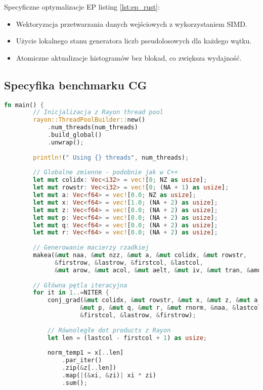 Specyficzne optymalizacje EP listing \ref{lst:ep_rust}:
\begin{itemize}
    \item Wektoryzacja przetwarzania danych wejściowych z wykorzystaniem SIMD.
    \item Użycie lokalnego stanu generatora liczb pseudolosowych dla każdego wątku.
    \item Atomiczne aktualizacje histogramów bez blokad, co zwiększa wydajność.
\end{itemize}

\subsection{Specyfika benchmarku CG}
\begin{lstlisting}[language=Rust, caption={Implementacja benchmarku CG w języku Rust}, label={lst:cg_rust}]
    fn main() {
        // Inicjalizacja z Rayon thread pool
        rayon::ThreadPoolBuilder::new()
            .num_threads(num_threads)
            .build_global()
            .unwrap();
    
        println!(" Using {} threads", num_threads);
        
        // Globalne zmienne - podobnie jak w C++
        let mut colidx: Vec<i32> = vec![0; NZ as usize];
        let mut rowstr: Vec<i32> = vec![0; (NA + 1) as usize];
        let mut a: Vec<f64> = vec![0.0; NZ as usize];
        let mut x: Vec<f64> = vec![1.0; (NA + 2) as usize];
        let mut z: Vec<f64> = vec![0.0; (NA + 2) as usize];
        let mut p: Vec<f64> = vec![0.0; (NA + 2) as usize];
        let mut q: Vec<f64> = vec![0.0; (NA + 2) as usize];
        let mut r: Vec<f64> = vec![0.0; (NA + 2) as usize];
    
        // Generowanie macierzy rzadkiej
        makea(&mut naa, &mut nzz, &mut a, &mut colidx, &mut rowstr, 
              &firstrow, &lastrow, &firstcol, &lastcol, 
              &mut arow, &mut acol, &mut aelt, &mut iv, &mut tran, &amult);
    
        // Główna pętla iteracyjna
        for it in 1..=NITER {
            conj_grad(&mut colidx, &mut rowstr, &mut x, &mut z, &mut a, 
                     &mut p, &mut q, &mut r, &mut rnorm, &naa, &lastcol, 
                     &firstcol, &lastrow, &firstrow);
            
            // Równoległe dot products z Rayon
            let len = (lastcol - firstcol + 1) as usize;
            
            norm_temp1 = x[..len]
                .par_iter()
                .zip(&z[..len])
                .map(|(&xi, &zi)| xi * zi)
                .sum();
    

\end{lstlisting}
